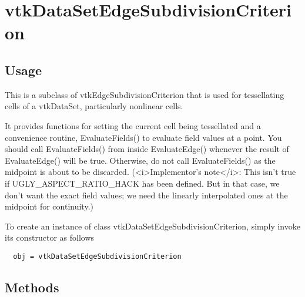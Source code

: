 \section{vtkDataSetEdgeSubdivisionCriterion}

\subsection{Usage}

 This is a subclass of vtkEdgeSubdivisionCriterion that is used for
 tessellating cells of a vtkDataSet, particularly nonlinear
 cells.

 It provides functions for setting the current cell being tessellated and a
 convenience routine,  EvaluateFields() to evaluate field values at a
 point. You should call  EvaluateFields() from inside  EvaluateEdge()
 whenever the result of  EvaluateEdge() will be true. Otherwise, do
 not call  EvaluateFields() as the midpoint is about to be discarded.
 (<i>Implementor's note</i>: This isn't true if UGLY\_ASPECT\_RATIO\_HACK
 has been defined. But in that case, we don't want the exact field values;
 we need the linearly interpolated ones at the midpoint for continuity.)


To create an instance of class vtkDataSetEdgeSubdivisionCriterion, simply
invoke its constructor as follows
\begin{verbatim}
  obj = vtkDataSetEdgeSubdivisionCriterion
\end{verbatim}
\subsection{Methods}

